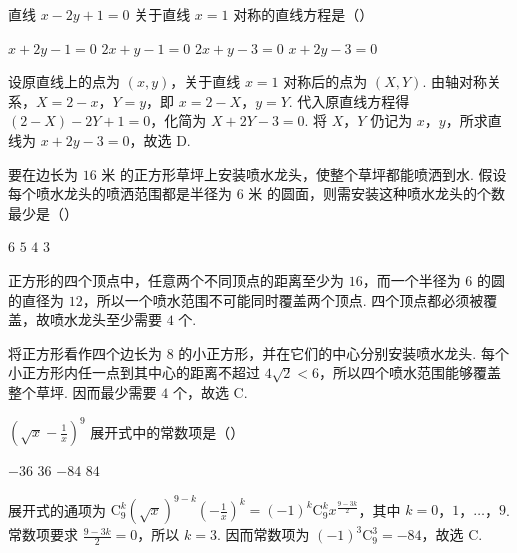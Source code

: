 \begin{problem}
直线 \(x - 2y + 1 = 0\) 关于直线 \(x = 1\) 对称的直线方程是（\quad）

\choices
    {\(x + 2y - 1 = 0\)}
    {\(2x + y - 1 = 0\)}
    {\(2x + y - 3 = 0\)}
    {\(x + 2y - 3 = 0\)}
\end{problem}

\begin{solution}
设原直线上的点为 \((x,y)\)，关于直线 \(x=1\) 对称后的点为 \((X,Y)\). 由轴对称关系，\(X=2-x\)，\(Y=y\)，即 \(x=2-X\)，\(y=Y\). 代入原直线方程得 \((2-X)-2Y+1=0\)，化简为 \(X+2Y-3=0\). 将 \(X\)，\(Y\) 仍记为 \(x\)，\(y\)，所求直线为 \(x+2y-3=0\)，故选 D.
\end{solution}

\begin{problem}
要在边长为 \(16\text{ 米}\) 的正方形草坪上安装喷水龙头，使整个草坪都能喷洒到水. 假设每个喷水龙头的喷洒范围都是半径为 \(6\text{ 米}\) 的圆面，则需安装这种喷水龙头的个数最少是（\quad）


\choices
    {\(6\)}
    {\(5\)}
    {\(4\)}
    {\(3\)}
\end{problem}

\begin{solution}
正方形的四个顶点中，任意两个不同顶点的距离至少为 \(16\)，而一个半径为 \(6\) 的圆的直径为 \(12\)，所以一个喷水范围不可能同时覆盖两个顶点. 四个顶点都必须被覆盖，故喷水龙头至少需要 \(4\) 个.

将正方形看作四个边长为 \(8\) 的小正方形，并在它们的中心分别安装喷水龙头. 每个小正方形内任一点到其中心的距离不超过 \(4\sqrt{2}<6\)，所以四个喷水范围能够覆盖整个草坪. 因而最少需要 \(4\) 个，故选 C.
\end{solution}

\begin{problem}
\(\left(\sqrt{x} - \frac{1}{x}\right)^9\) 展开式中的常数项是（\quad）

\choices
    {\(-36\)}
    {\(36\)}
    {\(-84\)}
    {\(84\)}
\end{problem}

\begin{solution}
展开式的通项为 \(\mathrm C_9^k\left(\sqrt{x}\right)^{9-k}\left(-\frac{1}{x}\right)^k=(-1)^k\mathrm C_9^k x^{\frac{9-3k}{2}}\)，其中 \(k=0\)，\(1\)，\(\ldots\)，\(9\). 常数项要求 \(\frac{9-3k}{2}=0\)，所以 \(k=3\). 因而常数项为 \((-1)^3\mathrm C_9^3=-84\)，故选 C.
\end{solution}


